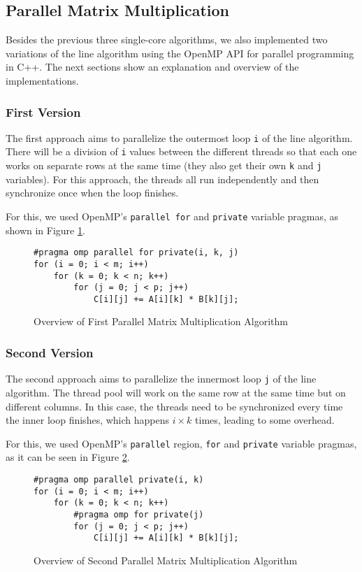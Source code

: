 \subsection{Parallel Matrix Multiplication}

Besides the previous three single-core algorithms, we also implemented two variations of the line algorithm using the OpenMP API for parallel programming in C++. The next sections show an explanation and overview of the implementations.

\subsubsection{First Version}

The first approach aims to parallelize the outermost loop \verb#i# of the line algorithm. There will be a division of \verb#i# values between the different threads so that each one works on separate rows at the same time (they also get their own \verb#k# and \verb#j# variables). For this approach, the threads all run independently and then synchronize once when the loop finishes.

For this, we used OpenMP's \verb#parallel for# and \verb#private# variable pragmas, as shown in Figure \ref{fig:algo:parallel1}.

\begin{figure}[ht!]
\begin{verbatim}
#pragma omp parallel for private(i, k, j)
for (i = 0; i < m; i++)
    for (k = 0; k < n; k++)
        for (j = 0; j < p; j++)
            C[i][j] += A[i][k] * B[k][j];
\end{verbatim}
\caption{Overview of First Parallel Matrix Multiplication Algorithm}
\label{fig:algo:parallel1}
\end{figure}

\subsubsection{Second Version}

The second approach aims to parallelize the innermost loop \verb#j# of the line algorithm. The thread pool will work on the same row at the same time but on different columns. In this case, the threads need to be synchronized every time the inner loop finishes, which happens $i\times k$ times, leading to some overhead.

For this, we used OpenMP's \verb#parallel# region, \verb#for# and \verb#private# variable pragmas, as it can be seen in Figure \ref{fig:algo:parallel2}.

\begin{figure}[ht!]
\begin{verbatim}
#pragma omp parallel private(i, k)
for (i = 0; i < m; i++)
    for (k = 0; k < n; k++)
        #pragma omp for private(j)
        for (j = 0; j < p; j++)
            C[i][j] += A[i][k] * B[k][j];
\end{verbatim}
\caption{Overview of Second Parallel Matrix Multiplication Algorithm}
\label{fig:algo:parallel2}
\end{figure}
